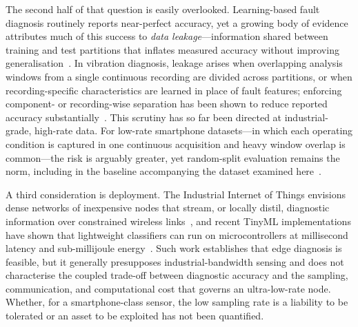 The second half of that question is easily overlooked. Learning-based fault
diagnosis routinely reports near-perfect accuracy, yet a growing body of evidence
attributes much of this success to \emph{data leakage}---information shared
between training and test partitions that inflates measured accuracy without
improving generalisation~\cite{kapoor2023leakage}. In vibration diagnosis, leakage
arises when overlapping analysis windows from a single continuous recording are
divided across partitions, or when recording-specific characteristics are learned
in place of fault features; enforcing component- or recording-wise separation has
been shown to reduce reported accuracy substantially~\cite{wheat2024impact,
hendriks2022towards}. This scrutiny has so far been directed at industrial-grade,
high-rate data. For low-rate smartphone datasets---in which each operating
condition is captured in one continuous acquisition and heavy window overlap is
common---the risk is arguably greater, yet random-split evaluation remains the
norm, including in the baseline accompanying the dataset examined
here~\cite{ertargin2026smartphone}.

A third consideration is deployment. The Industrial Internet of Things envisions
dense networks of inexpensive nodes that stream, or locally distil, diagnostic
information over constrained wireless links~\cite{yousuf2024iot}, and recent
TinyML implementations have shown that lightweight classifiers can run on
microcontrollers at millisecond latency and sub-millijoule
energy~\cite{gao2025edge, asutkar2023tinyml}. Such work establishes that edge
diagnosis is feasible, but it generally presupposes industrial-bandwidth sensing
and does not characterise the coupled trade-off between diagnostic accuracy and
the sampling, communication, and computational cost that governs an ultra-low-rate
node. Whether, for a smartphone-class sensor, the low sampling rate is a liability
to be tolerated or an asset to be exploited has not been quantified.

